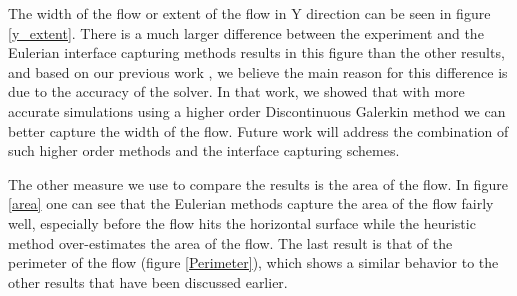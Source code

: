 \documentclass[review]{elsarticle}
\begin{document}
The width of the flow or extent of the flow in Y direction can be seen in figure \ref{y_extent}. 
There is a much larger difference between the experiment and the Eulerian interface capturing methods results in this figure than the other results, 
and based on our previous work \cite{Patra2006}, we believe the main reason for this difference is due to the accuracy of the solver. 
In that work, we showed that with more accurate simulations using a higher order Discontinuous Galerkin method we can better capture the width of the flow.
Future work will address the combination of such higher order methods and the interface capturing schemes.

The other measure we use to compare the results is the area of the flow. 
In figure \ref{area}  one can see that the Eulerian methods capture the area of the flow fairly well,
especially before the flow hits the horizontal surface while the heuristic method over-estimates the area of the flow. 
The last result is that of the perimeter of the flow (figure \ref{Perimeter}), which shows a similar behavior 
to the other results that have been discussed earlier. 
\end{document}
